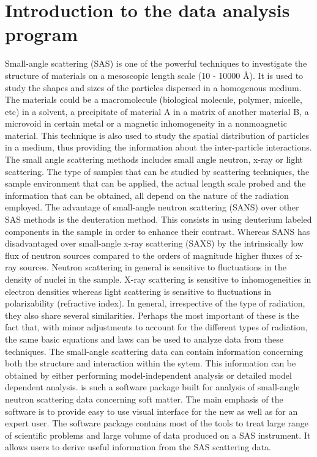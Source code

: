 \chapter{Introduction to the data analysis program \SASfit}

Small-angle scattering (SAS) is one of the powerful techniques to
investigate the structure of materials on a mesoscopic length scale
(10 - 10000 {\AA}). It is used to study the shapes and sizes of the
particles dispersed in a homogenous medium. The materials could be a
macromolecule (biological molecule, polymer, micelle, etc) in a
solvent, a precipitate of material A in a matrix of another material
B, a microvoid in certain metal or a magnetic inhomogeneity in a
nonmoagnetic material. This technique is also used to study the
spatial distribution of particles in a medium, thus providing the
information about the inter-particle interactions. The small angle
scattering methods includes small angle neutron, x-ray or light
scattering. The type of samples that can be studied by scattering
techniques, the sample environment that can be applied, the actual
length scale probed and the information that can be obtained, all
depend on the nature of the radiation employed. The advantage of
small-angle neutron scattering (SANS) over other SAS methods is the
deuteration method. This consists in using deuterium labeled
components in the sample in order to enhance their contrast. Whereas
SANS has disadvantaged over small-angle x-ray scattering (SAXS) by
the intrinsically low flux of neutron sources compared to the orders
of magnitude higher fluxes of x-ray sources. Neutron scattering in
general is sensitive to fluctuations in the density of nuclei in the
sample. X-ray scattering is sensitive to inhomogeneities in electron
densities whereas light scattering is sensitive to fluctuations in
polarizability (refractive index). In general, irrespective of the
type of radiation, they also share several similarities. Perhaps the
most important of these is the fact that, with minor adjustments to
account for the different types of radiation, the same basic
equations and laws can be used to analyze data from these
techniques. The small-angle scattering data can contain information
concerning both the structure and interaction within the sytem. This
information can be obtained by either performing model-independent
analysis or detailed model dependent analysis. \SASfit is such a
software package built for analysis of small-angle neutron
scattering data concerning soft matter. The main emphasis of the
software is to provide easy to use visual interface for the new as
well as for an expert user. The software package contains most of
the tools to treat large range of scientific problems and large
volume of data produced on a SAS instrument. It allows users to
derive useful information from the SAS scattering data.

